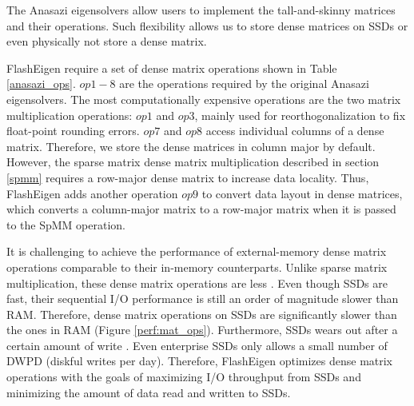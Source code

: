 The Anasazi eigensolvers allow users to implement
the tall-and-skinny matrices and their operations. Such flexibility allows us to
store dense matrices on SSDs or even physically not store a dense matrix.

FlashEigen require a set of dense matrix operations shown in Table
\ref{anasazi_ops}. $op1-8$ are the operations required by the original Anasazi
eigensolvers. The most computationally expensive operations are the two
matrix multiplication operations: $op1$ and $op3$, mainly used for
reorthogonalization to fix float-point rounding errors.
$op7$ and $op8$ access individual columns of a dense matrix.
Therefore, we store the dense matrices in column major by default.
However, the sparse matrix dense matrix multiplication described in section
\ref{spmm} requires a row-major dense matrix to increase data locality.
Thus, FlashEigen adds another operation $op9$ to convert data layout
in dense matrices, which converts a column-major matrix to a row-major
matrix when it is passed to the SpMM operation.

It is challenging to achieve the performance of external-memory dense matrix
operations comparable to their in-memory counterparts. Unlike sparse matrix
multiplication, these dense matrix operations are less . Even though SSDs are fast, their sequential I/O performance is
still an order of magnitude slower than RAM. Therefore, dense matrix operations
on SSDs are significantly slower than the ones in RAM (Figure \ref{perf:mat_ops}).
Furthermore, SSDs wears out after a certain amount of write \cite{}.
Even enterprise SSDs \cite{} only allows a small number of DWPD
(diskful writes per day). Therefore, FlashEigen optimizes dense matrix operations
with the goals of maximizing I/O throughput from SSDs and minimizing the amount
of data read and written to SSDs.

%		

